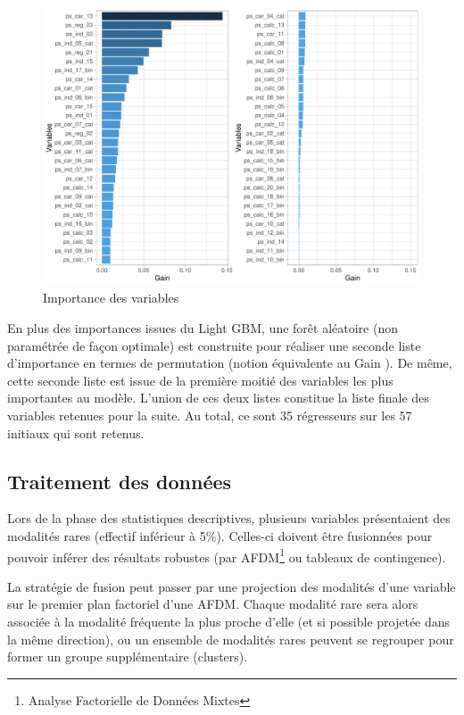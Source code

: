 \documentclass[french]{article}
\begin{document}
\begin{multicols}{2}
\begin{figure}[H] \centering
  \includegraphics[width = \columnwidth]{img/var_imp_lgb}
  \caption{Importance des variables}
\end{figure}


En plus des importances issues du Light GBM, une forêt aléatoire (non paramétrée de façon optimale) est construite pour réaliser une seconde liste d'importance en termes de \og permutation \fg{} (notion équivalente au \og Gain \fg{}). De même, cette seconde liste est issue de la première moitié des variables les plus importantes au modèle. L'union de ces deux listes constitue la liste finale des variables retenues pour la suite. Au total, ce sont 35 régresseurs sur les 57 initiaux qui sont retenus.


\subsection{Traitement des données}

Lors de la phase des statistiques descriptives, plusieurs variables présentaient des modalités rares (effectif inférieur à 5\%). Celles-ci doivent être fusionnées pour pouvoir inférer des résultats robustes (par AFDM\footnote{Analyse Factorielle de Données Mixtes} ou tableaux de contingence).

La stratégie de fusion peut passer par une projection des modalités d'une variable sur le premier plan factoriel d'une AFDM. Chaque modalité rare sera alors associée à la modalité fréquente la plus proche d'elle (et si possible projetée dans la même direction), ou un ensemble de modalités rares peuvent se regrouper pour former un groupe supplémentaire (clusters).


\end{multicols}
\end{document}

